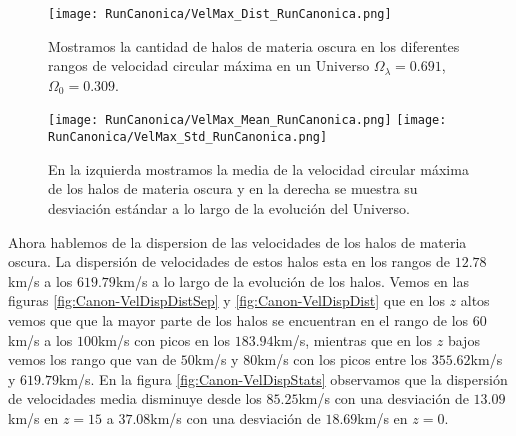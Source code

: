\begin{figure}[H]
    \centering
    \texttt{[image: RunCanonica/VelMax\_Dist\_RunCanonica.png]}
    \caption[Distribución de la velocidad circular máxima]{\footnotesize Mostramos la cantidad de halos de materia oscura en los diferentes rangos de velocidad circular máxima en un Universo $\Omega_\lambda = 0.691 $, $\Omega_0 = 0.309$.}
    \label{fig:Canon-VelMaxDist}
\end{figure}

\begin{figure}[H]
    \centering
    \texttt{[image: RunCanonica/VelMax\_Mean\_RunCanonica.png]}
    \texttt{[image: RunCanonica/VelMax\_Std\_RunCanonica.png]}
    \caption[Media y desviación estándar de la velocidad circular máxima]{\footnotesize En la izquierda mostramos la media de la velocidad circular máxima de los halos de materia oscura y en la derecha se muestra su desviación estándar a lo largo de la evolución del Universo.}
    \label{fig:Canon-VelMaxStats}
\end{figure}

Ahora hablemos de la dispersion de las velocidades de los halos de materia oscura. La dispersión de velocidades de estos halos esta en los rangos de $12.78$km/s a los $619.79$km/s a lo largo de la evolución de los halos. Vemos en las figuras \ref{fig:Canon-VelDispDistSep} y \ref{fig:Canon-VelDispDist} que en los $z$ altos vemos que que la mayor parte de los halos se encuentran en el rango de los $60$km/s a los $100$km/s con picos en los $183.94$km/s, mientras que en los $z$ bajos vemos los rango que van de $50$km/s y $80$km/s con los picos entre los $355.62$km/s y $619.79$km/s. En la figura \ref{fig:Canon-VelDispStats} observamos que la dispersión de velocidades media disminuye desde los $85.25$km/s con una desviación de $13.09$km/s en $z=15$ a $37.08$km/s con una desviación de $18.69$km/s en $z=0$.



